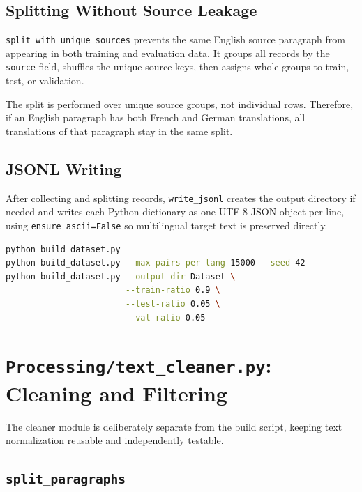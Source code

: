\documentclass[12pt,a4paper]{article}
\begin{document}
\subsection{Splitting Without Source Leakage}

\texttt{split\_with\_unique\_sources} prevents the same English source paragraph from appearing in both training and evaluation data. It groups all records by the \texttt{source} field, shuffles the unique source keys, then assigns whole groups to train, test, or validation.

The split is performed over unique source groups, not individual rows. Therefore, if an English paragraph has both French and German translations, all translations of that paragraph stay in the same split.

\subsection{JSONL Writing}

After collecting and splitting records, \texttt{write\_jsonl} creates the output directory if needed and writes each Python dictionary as one UTF-8 JSON object per line, using \texttt{ensure\_ascii=False} so multilingual target text is preserved directly.

\begin{lstlisting}[language=bash, caption={CLI usage examples for \texttt{build\_dataset.py}.}]
python build_dataset.py
python build_dataset.py --max-pairs-per-lang 15000 --seed 42
python build_dataset.py --output-dir Dataset \
                        --train-ratio 0.9 \
                        --test-ratio 0.05 \
                        --val-ratio 0.05
\end{lstlisting}

\section{\texttt{Processing/text\_cleaner.py}: Cleaning and Filtering}

The cleaner module is deliberately separate from the build script, keeping text normalization reusable and independently testable.

\subsection{\texttt{split\_paragraphs}}
\end{document}
